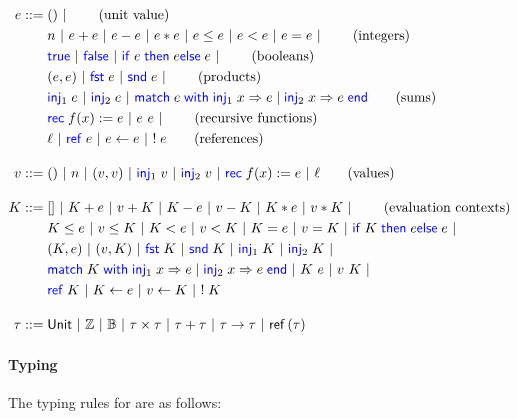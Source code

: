 \documentclass{scrartcl}
\begin{document}
\begin{align*}
  \expr \BNFdef{}
  & \TT \ALT \tag{unit value} \\
  & \Num \ALT \expr + \expr \ALT \expr - \expr \ALT \expr * \expr \ALT \expr \le \expr \ALT \expr < \expr \ALT \expr = \expr \ALT \tag{integers}\\
  & \True \ALT \False \ALT \If \expr then \expr \Else \expr \ALT \tag{booleans} \\
  & (\expr, \expr) \ALT \Fst \expr \ALT \Snd \expr \ALT \tag{products} \\
  & \Inj{1} \expr \ALT \Inj{2} \expr \ALT \Match \expr with \Inj{1} \var => \expr | \Inj{2} \var => \expr end \tag{sums}\\
  & \Rec f \var := \expr \ALT \expr~\expr \ALT \tag{recursive functions}\\
  & \loc \ALT \alloc \expr \ALT \expr \gets \expr \ALT \deref \expr \tag{references}\\[1em]
  \val \BNFdef{}
  & \TT \ALT \Num \ALT (\val, \val) \ALT \Inj{1} \val \ALT \Inj{2} \val \ALT \Rec f \var := \expr \ALT \loc \tag{values}\\[1em]
  \elctx \BNFdef{}
  & \empelctx \ALT \elctx + \expr \ALT \val + \elctx \ALT \elctx - \expr \ALT \val - \elctx \ALT \elctx * \expr \ALT \val * \elctx \ALT \tag{evaluation contexts}\\
  & \elctx \le \expr \ALT \val \le \elctx \ALT \elctx < \expr \ALT \val < \elctx \ALT \elctx = \expr \ALT \val = \elctx \ALT \If \elctx then \expr \Else \expr \ALT \\
  & (\elctx, \expr) \ALT (\val, \elctx) \ALT \Fst \elctx \ALT \Snd \elctx \ALT \Inj{1} \elctx \ALT \Inj{2} \elctx \ALT\\
  &  \Match \elctx with \Inj{1} \var => \expr | \Inj{2} \var => \expr end \ALT
    \elctx~\expr \ALT \val~\elctx \ALT\\
  & \alloc \elctx \ALT \elctx \gets \expr \ALT \val \gets \elctx \ALT \deref \elctx \\[1em]
  \typ \BNFdef{}
  & \Tunit \ALT \Tint \ALT \Tbool \ALT \typ \times \typ \ALT \typ + \typ \ALT \typ \to \typ \ALT \Tref{\typ}
\end{align*}

\paragraph{Typing}
The typing rules for \TheLang{} are as follows:
\end{document}
